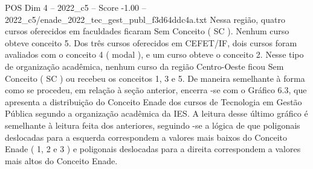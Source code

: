\begin{textsample}{POS Dim 4 – 2022\_c5 – Score -1.00 – 2022\_c5/enade\_2022\_tec\_gest\_publ\_f3d64ddc4a.txt}
Nessa região, quatro cursos oferecidos em faculdades ficaram Sem Conceito ( SC ).
Nenhum curso obteve conceito 5.
Dos três cursos oferecidos em CEFET/IF, dois cursos foram avaliados com o conceito 4 ( modal ), e um curso obteve o conceito 2.
Nesse tipo de organização acadêmica, nenhum curso da região Centro-Oeste ficou Sem Conceito ( SC ) ou recebeu os conceitos 1, 3 e 5.
De maneira semelhante à forma como se procedeu, em relação à seção anterior, encerra -se com o Gráfico 6.3, que apresenta a distribuição do Conceito Enade dos cursos de Tecnologia em Gestão Pública segundo a organização acadêmica da IES.
A leitura desse último gráfico é semelhante à leitura feita dos anteriores, seguindo -se a lógica de que poligonais deslocadas para a esquerda correspondem a valores mais baixos do Conceito Enade ( 1, 2 e 3 ) e poligonais deslocadas para a direita correspondem a valores mais altos do Conceito Enade.

\end{textsample}
